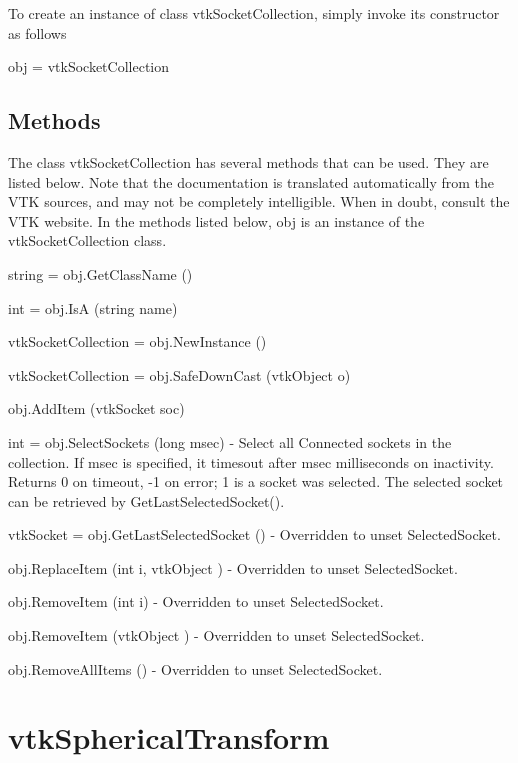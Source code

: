To create an instance of class vtk\-Socket\-Collection, simply invoke its constructor as follows \begin{DoxyVerb}  obj = vtkSocketCollection
\end{DoxyVerb}
 \hypertarget{vtkwidgets_vtkxyplotwidget_Methods}{}\subsection{Methods}\label{vtkwidgets_vtkxyplotwidget_Methods}
The class vtk\-Socket\-Collection has several methods that can be used. They are listed below. Note that the documentation is translated automatically from the V\-T\-K sources, and may not be completely intelligible. When in doubt, consult the V\-T\-K website. In the methods listed below, {\ttfamily obj} is an instance of the vtk\-Socket\-Collection class. 
\begin{DoxyItemize}
\item {\ttfamily string = obj.\-Get\-Class\-Name ()}  
\item {\ttfamily int = obj.\-Is\-A (string name)}  
\item {\ttfamily vtk\-Socket\-Collection = obj.\-New\-Instance ()}  
\item {\ttfamily vtk\-Socket\-Collection = obj.\-Safe\-Down\-Cast (vtk\-Object o)}  
\item {\ttfamily obj.\-Add\-Item (vtk\-Socket soc)}  
\item {\ttfamily int = obj.\-Select\-Sockets (long msec)} -\/ Select all Connected sockets in the collection. If msec is specified, it timesout after msec milliseconds on inactivity. Returns 0 on timeout, -\/1 on error; 1 is a socket was selected. The selected socket can be retrieved by Get\-Last\-Selected\-Socket().  
\item {\ttfamily vtk\-Socket = obj.\-Get\-Last\-Selected\-Socket ()} -\/ Overridden to unset Selected\-Socket.  
\item {\ttfamily obj.\-Replace\-Item (int i, vtk\-Object )} -\/ Overridden to unset Selected\-Socket.  
\item {\ttfamily obj.\-Remove\-Item (int i)} -\/ Overridden to unset Selected\-Socket.  
\item {\ttfamily obj.\-Remove\-Item (vtk\-Object )} -\/ Overridden to unset Selected\-Socket.  
\item {\ttfamily obj.\-Remove\-All\-Items ()} -\/ Overridden to unset Selected\-Socket.  
\end{DoxyItemize}\hypertarget{vtkcommon_vtksphericaltransform}{}\section{vtk\-Spherical\-Transform}\label{vtkcommon_vtksphericaltransform}
